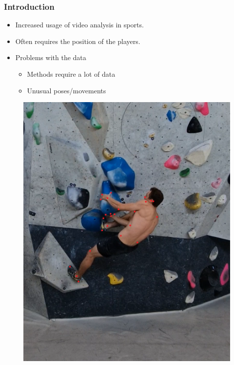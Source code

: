 \documentclass{beamer}
\begin{document}
\begin{frame}
    \frametitle{Introduction}
    \begin{minipage}{0.5\textwidth}
        \begin{itemize}
            \item<1-> Increased usage of video analysis in sports.
            \item<1-> Often requires the position of the players.
            \item<1-> Problems with the data
            \begin{itemize}
                \item Methods require a lot of data
                \item Unusual poses/movements
            \end{itemize}
        \end{itemize}
    \end{minipage} \hfill
    \begin{minipage}{0.45\textwidth}
        \begin{figure}
            \center
            \includegraphics[width = \textwidth]{./entities/ClimbAlong_cv_2.PNG}
        \end{figure}
    \end{minipage}
\end{frame}
\end{document}
